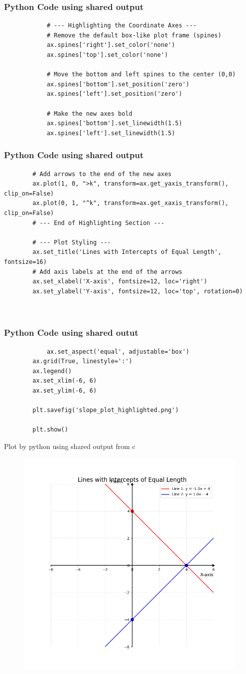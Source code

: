 \documentclass{beamer}
\begin{document}
	\begin{frame}[fragile]
		\frametitle{Python Code using shared output}
		\begin{lstlisting}
			# --- Highlighting the Coordinate Axes ---
			# Remove the default box-like plot frame (spines)
			ax.spines['right'].set_color('none')
			ax.spines['top'].set_color('none')
			
			# Move the bottom and left spines to the center (0,0)
			ax.spines['bottom'].set_position('zero')
			ax.spines['left'].set_position('zero')
			
			# Make the new axes bold
			ax.spines['bottom'].set_linewidth(1.5)
			ax.spines['left'].set_linewidth(1.5)
		\end{lstlisting}
	\end{frame}
	
	\begin{frame}[fragile]
		\frametitle{Python Code using shared output}
		\begin{lstlisting}
		# Add arrows to the end of the new axes
		ax.plot(1, 0, ">k", transform=ax.get_yaxis_transform(), clip_on=False)
		ax.plot(0, 1, "^k", transform=ax.get_xaxis_transform(), clip_on=False)
		# --- End of Highlighting Section ---
		
		# --- Plot Styling ---
		ax.set_title('Lines with Intercepts of Equal Length', fontsize=16)
		# Add axis labels at the end of the arrows
		ax.set_xlabel('X-axis', fontsize=12, loc='right')
		ax.set_ylabel('Y-axis', fontsize=12, loc='top', rotation=0)
		
	
		\end{lstlisting}
	\end{frame}
	
	\begin{frame}[fragile]
		\frametitle{Python Code using shared outut}
		\begin{lstlisting}
			ax.set_aspect('equal', adjustable='box')
		ax.grid(True, linestyle=':')
		ax.legend()
		ax.set_xlim(-6, 6)
		ax.set_ylim(-6, 6)
		
		plt.savefig('slope_plot_highlighted.png')
		
		plt.show()
		\end{lstlisting}
	\end{frame}
	
	\begin{frame}{Plot by python using shared output from c}
		\begin{center}
			\begin{figure}[H]
				\centering
				\includegraphics[width = 0.6\columnwidth]{figs/Figure_1.png}
				\caption*{}
				\label{}
			\end{figure}
		\end{center}
	\end{frame}
	
	
\end{document}
